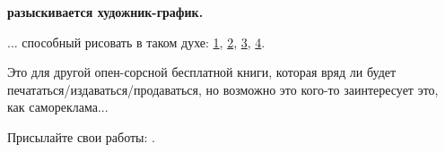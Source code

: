 \vspace*{\fill}

\normalsize \textbf{разыскивается художник-график.}

\bigskip
\bigskip
\bigskip

... способный рисовать в таком духе:
\href{https://github.com/DennisYurichev/RE-for-beginners/blob/master/cover.jpg}{1},
\href{https://github.com/DennisYurichev/RE-for-beginners/blob/master/cover2.jpg}{2},
\href{https://github.com/DennisYurichev/RE-for-beginners/blob/master/cover3.jpg}{3},
\href{https://github.com/DennisYurichev/RE-for-beginners/blob/master/cover4.jpg}{4}.

Это для другой опен-сорсной бесплатной книги, которая вряд ли будет печататься/издаваться/продаваться,
но возможно это кого-то заинтересует это, как самореклама...

Присылайте свои работы: \EMAIL.

\bigskip
\bigskip
\bigskip

\vspace*{\fill}
\vfill
